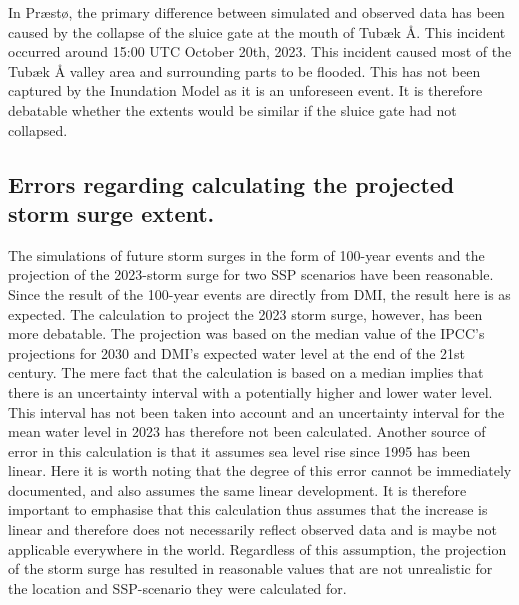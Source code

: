In Præstø, the primary difference between simulated and observed data has been caused by the collapse of the sluice gate at the mouth of Tubæk Å. This incident occurred around 15:00 UTC October 20th, 2023. This incident caused most of the Tubæk Å valley area and surrounding parts to be flooded. This has not been captured by the Inundation Model as it is an unforeseen event. It is therefore debatable whether the extents would be similar if the sluice gate had not collapsed.\\

\subsection{Errors regarding calculating the projected storm surge extent.}
The simulations of future storm surges in the form of 100-year events and the projection of the 2023-storm surge for two SSP scenarios have been reasonable. Since the result of the 100-year events are directly from DMI, the result here is as expected. The calculation to project the 2023 storm surge, however, has been more debatable. The projection was based on the median value of the IPCC's projections for 2030 and DMI's expected water level at the end of the 21st century. The mere fact that the calculation is based on a median implies that there is an uncertainty interval with a potentially higher and lower water level. This interval has not been taken into account and an uncertainty interval for the mean water level in 2023 has therefore not been calculated. Another source of error in this calculation is that it assumes sea level rise since 1995 has been linear. Here it is worth noting that the degree of this error cannot be immediately documented, and \cite{danish_meteorological_institute_dmi_2024} also assumes the same linear development. It is therefore important to emphasise that this calculation thus assumes that the increase is linear and therefore does not necessarily reflect observed data and is maybe not applicable everywhere in the world. Regardless of this assumption, the projection of the storm surge has resulted in reasonable values that are not unrealistic for the location and SSP-scenario they were calculated for.\\


